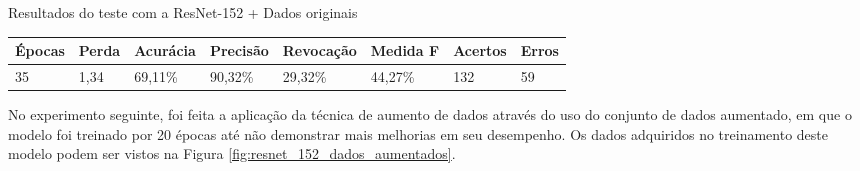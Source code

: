 \documentclass[
	12pt,				%
	oneside,			%
	a4paper,			%
	english,			%
	brazil				%
	]{abntex2ppgsi}
\begin{document}
\begin{quadro}[H]
\caption{Resultados do teste com a ResNet-152 + Dados originais}
\label{quad:resultados_teste_resnet_152_com_dados_originais}
\centering
\begin{tabular}{|l|l|l|l|l|l|l|l|}
\cline{1-8}
Épocas & Perda & Acurácia & Precisão & Revocação & Medida F & Acertos & Erros \\ \hline
35 & 1,34 & 69,11\% & 90,32\% & 29,32\% & 44,27\% & 132 & 59 \\
\cline{1-8}
\end{tabular}
\end{quadro}

No experimento seguinte, foi feita a aplicação da técnica de aumento de dados através do uso do conjunto de dados aumentado, em que o modelo foi treinado por 20 épocas até não demonstrar mais melhorias em seu desempenho. Os dados adquiridos no treinamento deste modelo podem ser vistos na Figura \ref{fig:resnet_152_dados_aumentados}.
\end{document}
